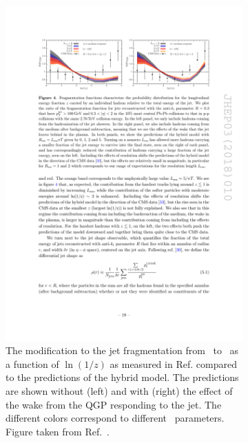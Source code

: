 \begin{figure}
\begin{subfigure}{1\textwidth}
  \centering
\includegraphics[width=1\textwidth]{figures/jetMeasurements/HM_FF}
\caption{The modification to the jet fragmentation from \pp\ to \pbpb\ as a function of $\ln(1/z)$ as measured in Ref.
\cite{Chatrchyan:2014ava} compared to the predictions of the hybrid model.
The predictions are shown without (left) and with (right) the effect of the wake from the QGP responding to the jet.
The different colors correspond to different \Lres\ parameters.
Figure taken from Ref.~\cite{Hulcher:2017cpt}.}
\label{fig:hm_ff}
\end{subfigure} \\ \\ \\
\begin{subfigure}{1\textwidth}
  \centering

\end{subfigure}
\end{figure}
